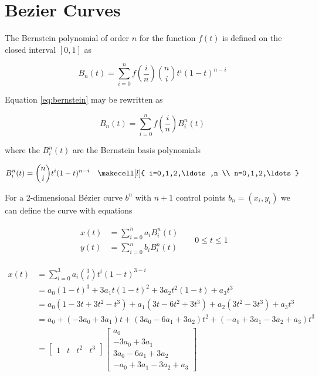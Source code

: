 \section{Bezier Curves}
\label{sec:bezier}

The Bernstein polynomial of order $n$ for the function $f(t)$ is defined on the closed interval $[0,1]$ as

\begin{equation}
    B_n(t) = \sum_{i=0}^n f\left(\frac{i}{n}\right){n\choose i} t^i\left(1-t\right)^{n-i}
    \label{eq:bernstein}
\end{equation}

Equation \ref{eq:bernstein} may be rewritten as

\begin{equation}
    B_n(t) = \sum_{i=0}^n f\left(\frac{i}{n}\right) B_i^n(t)
\end{equation}

where the $B_i^n(t)$ are the Bernstein basis polynomials

\begin{align}
    B_i^n(t) = {n\choose i} t^i (1-t)^{n-i} & & \makecell[l]{ i=0,1,2,\ldots,n \\ n=0,1,2,\ldots }
\end{align}

For a 2-dimensional B\'ezier curve $b^n$ with $n+1$ control points $b_n = (x_i, y_i)$ we can define the curve with equations

\begin{align}
    \left.\begin{aligned}
        x(t) &= \sum_{i=0}^n a_i B_i^n(t) \\
        y(t) &= \sum_{i=0}^n b_i B_i^n(t)
    \end{aligned}\right.
    & & 0 \leq t \leq 1
\end{align}

\begin{align}
    x(t) &= \sum_{i=0}^3 a_i {3\choose i} t^i(1-t)^{3-i} \\
         &= a_0(1-t)^3 + 3a_1t(1-t)^2 + 3a_2t^2(1-t) + a_3t^3 \\
         &= a_0(1-3t+3t^2-t^3) + a_1(3t-6t^2+3t^3) + a_2(3t^2-3t^3) + a_3t^3 \\
         &= a_0 + (-3a_0+3a_1)t + (3a_0-6a_1+3a_2)t^2 + (-a_0+3a_1-3a_2+a_3)t^3 \\
         &= \begin{bmatrix}
                1 & t & t^2 & t^3
            \end{bmatrix}
            \begin{bmatrix}
                a_0 \\
                -3a_0 + 3a_1 \\
                3a_0  - 6a_1 + 3a_2 \\
                -a_0  + 3a_1 - 3a_2 + a_3
            \end{bmatrix}
\end{align}

